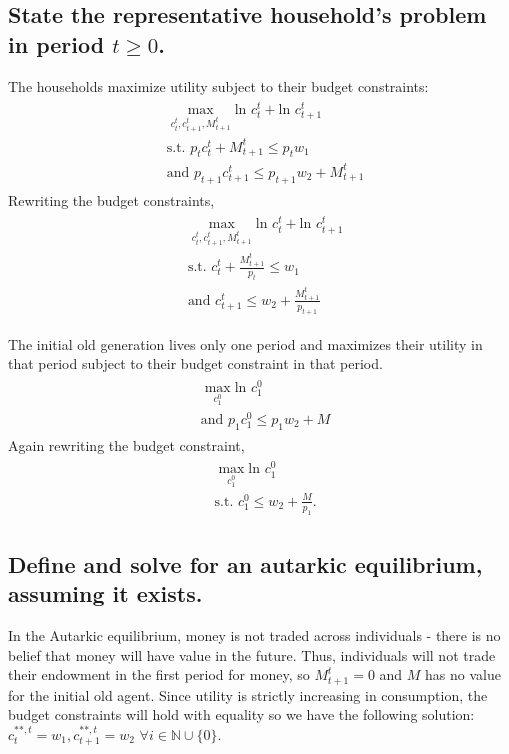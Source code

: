 \documentclass[11pt]{article} %
\begin{document}
\subsection{State the representative household's problem in period $t \geq 0$.}
The households maximize utility subject to their budget constraints:
\begin{align*}
\begin{split}
&\max_{c_{t}^{t},c_{t+1}^{t},M_{t+1}^t} \text{ln } c_{t}^{t} + \text{ln } c_{t+1}^{t}\\ 
&\text{s.t. } p_t c_{t}^{t} + M_{t+1}^{t} \leq p_t w_1 \\
&\text{and } p_{t+1} c_{t+1}^{t} \leq p_{t+1} w_2 + M_{t+1}^{t}
\end{split}
\end{align*}
Rewriting the budget constraints,
\begin{align}
\begin{split}
&\max_{c_{t}^{t},c_{t+1}^{t},M_{t+1}^t} \text{ln } c_{t}^{t} + \text{ln } c_{t+1}^{t}\\  \label{eqn:hh}
&\text{s.t. } c_{t}^{t} + \frac{M_{t+1}^{t}}{p_t} \leq w_1 \\
&\text{and }  c_{t+1}^{t} \leq w_2 + \frac{M_{t+1}^{t}}{p_{t+1}}
\end{split}
\end{align}


The initial old generation
 lives only one period and maximizes their utility in that period subject to their budget constraint in that period.
\begin{align*}
\begin{split}
&\max_{c_{1}^{0}} \text{ln } c_{1}^{0}\\ 
&\text{and } p_{1} c_{1}^{0} \leq p_{1} w_2 + M
\end{split}
\end{align*}
Again rewriting the budget constraint,
\begin{align*}
\begin{split}
&\max_{c_{1}^{0}} \text{ln } c_{1}^{0}\\ 
&\text{s.t. } c_{1}^{0} \leq w_2 + \frac{M}{p_1}.
\end{split}
\end{align*}

\subsection{Define and solve for an autarkic equilibrium, assuming it exists.}
In the Autarkic equilibrium, money is not traded across individuals - there is no belief that money will have value in the future. Thus, individuals will not trade their endowment in the first period for money, so $M_{t+1}^t = 0$ and $M$ has no value for the initial old agent. Since utility is strictly increasing in consumption, the budget constraints will hold with equality so we have the following solution: $c_t^{**,t} = w_1, c_{t+1}^{**,t} = w_2$ $\forall i \in \mathbb{N} \cup \{0\}.$
\end{document}
